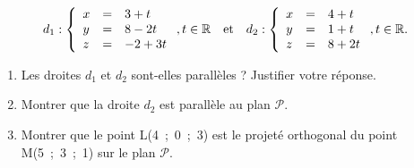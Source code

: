 \documentclass[10pt]{article}
\providecommand{\R}{\mathbb{R}}
\begin{document}
\[d_1  : \left\{\begin{array}{l c l}
x	&=&3 + t\\
y 	&=& 8 - 2t\\
z	&=& - 2 + 3t\\
\end{array}\right. , t \in \R\quad \text{et}\quad 
d_2  : \left\{\begin{array}{l c l}
x	&=&4 + t\\
y 	&=&1 + t\\
z	&=&8 + 2t\\
\end{array}\right. , t \in \R.\]

\begin{enumerate}[resume]
\item Les droites $d_1$ et $d_2$ sont-elles parallèles ? Justifier votre réponse.
\item Montrer que la droite $d_2$ est parallèle au plan $\mathcal P$.
\item Montrer que le point L(4~;~0~;~3) est le projeté orthogonal du point M(5~;~3~;~1) sur le plan $\mathcal P$.
\end{enumerate}


\bigskip
\end{document}
